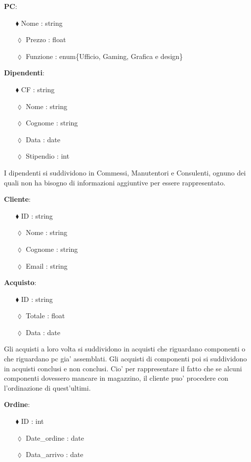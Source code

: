 \textbf{PC}:
\begin{itemize}
\item [$\blacklozenge$] Nome : string
\item [$\lozenge$] Prezzo : float
\item [$\lozenge$] Funzione : enum\{Ufficio, Gaming, Grafica e design\}
\end{itemize}

\textbf{Dipendenti}:
\begin{itemize}
\item [$\blacklozenge$] CF : string
\item [$\lozenge$] Nome : string
\item [$\lozenge$] Cognome : string
\item [$\lozenge$] Data : date
\item [$\lozenge$] Stipendio : int 
\end{itemize}
I dipendenti si suddividono in Commessi, Manutentori e Consulenti, ognuno dei quali non ha bisogno di informazioni aggiuntive per essere rappresentato.

\textbf{Cliente}:
\begin{itemize}
\item [$\blacklozenge$] ID : string
\item [$\lozenge$] Nome : string 
\item [$\lozenge$] Cognome : string
\item [$\lozenge$] Email : string
\end{itemize}

\textbf{Acquisto}:
\begin{itemize}
\item [$\blacklozenge$] ID : string
\item [$\lozenge$] Totale : float
\item [$\lozenge$] Data : date
\end{itemize}
Gli acquisti a loro volta si suddividono in acquisti che riguardano componenti o che riguardano pc gia' assemblati. Gli acquisti di componenti poi si suddividono in acquisti conclusi e non conclusi. Cio' per rappresentare il fatto che se alcuni componenti dovessero mancare in magazzino, il cliente puo' procedere con l'ordinazione di quest'ultimi.


\textbf{Ordine}:
\begin{itemize}
\item [$\blacklozenge$] ID : int
\item [$\lozenge$] Date\_ordine : date
\item [$\lozenge$] Data\_arrivo : date
\end{itemize}

